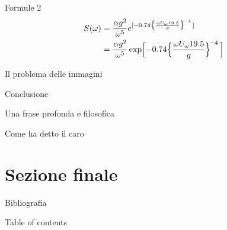 \documentclass{beamer}
\begin{document}
\begin{frame}{Formule 2}
    \begin{align*}
        S(\omega) 
        &= \frac{\alpha g^2}{\omega^5} e^{[ -0.74\bigl\{\frac{\omega U_\omega         19.5}{g}\bigr\}^{\!-4}\,]} \\
        &= \frac{\alpha g^2}{\omega^5} \exp\Bigl[ -0.74\Bigl\{\frac{\omega       U_\omega 19.5}{g}\Bigr\}^{\!-4}\,\Bigr] 
    \end{align*}
\end{frame}


\begin{frame}{Il problema delle immagini}
\end{frame}

\begin{frame}{Conclusione}
    \begin{alertblock}{Una frase profonda e filosofica}
        \lipsum[66]
    \end{alertblock}
\end{frame}

\begin{frame}
	\nocite{CF} Come ha detto il caro \cite{RAM} \newline
	\pause
\end{frame}

\section{Sezione finale}

\begin{frame}{Bibliografia}
	\printbibliography[heading=none]
\end{frame}

\begin{frame}{Table of contents}
	\tableofcontents
\end{frame}
\end{document}
